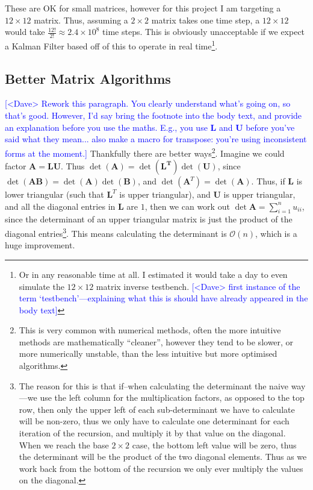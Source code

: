 \documentclass[12pt]{article}
\newcommand{\note}[2][red]{\textcolor{#1}{#2}}
\newcommand{\notedme}[1]{\note[blue]{[<Dave> #1]}}
\begin{document}
These are OK for small matrices, however for this project I am targeting a $12 \times 12$ matrix. Thus, assuming a $2\times2$ matrix takes one time step, a $12 \times 12$ would take $\frac{12!}{2!} \approx 2.4 \times 10^8$ time steps. This is obviously unacceptable if we expect a Kalman Filter based off of this to operate in real time\footnote{Or in any reasonable time at all. I estimated it would take a day to even simulate the $12\times12$ matrix inverse testbench. \notedme{first instance of the term `testbench'---explaining what this is should have already appeared in the body text}}.

\subsection{Better Matrix Algorithms}
\label{lu}

\notedme{Rework this paragraph. You clearly understand what's going on, so that's good. However, I'd say bring the footnote into the body text, and provide an explanation before you use the maths. E.g., you use $\mathbf{L}$ and $\mathbf{U}$ before you've said what they mean... also make a macro for transpose: you're using inconsistent forms at the moment.}
Thankfully there are better ways\footnote{This is very common with numerical methods, often the more intuitive methods are mathematically ``cleaner'', however they tend to be slower, or more numerically unstable, than the less intuitive but more optimised algorithms.}. Imagine we could factor $\mathbf{A} = \mathbf{L}\mathbf{U}$. Thus $\det(\mathbf{A}) = \det(\mathbf{L^T}) \det(\mathbf{U})$, since $\det(\mathbf{AB}) = \det(\mathbf{A}) \det(\mathbf{B})$, and $\det(\mathbf{A}^T) = \det(\mathbf{A})$. Thus,  if $\mathbf{L}$ is lower triangular (such that $\mathbf{L}^T$ is upper triangular), and $\mathbf{U}$ is upper triangular, and all the diagonal entries in $\mathbf{L}$ are $1$, then we can work out $\det{\mathbf{A}}=\sum_{i=1}^{n}u_{ii}$, since the determinant of an upper triangular matrix is just the product of the diagonal entries\footnote{The reason for this is that if--when calculating the determinant the naive way---we use the left column for the multiplication factors, as opposed to the top row, then only the upper left of each sub-determinant we have to calculate will be non-zero, thus we only have to calculate one determinant for each iteration of the recursion, and multiply it by that value on the diagonal. When we reach the base $2\times2$ case, the bottom left value will be zero, thus the determinant will be the product of the two diagonal elements. Thus as we work back from the bottom of the recursion we only ever multiply the values on the diagonal.}. This means calculating the determinant is $\mathcal{O}(n)$, which is a huge improvement.
\end{document}

